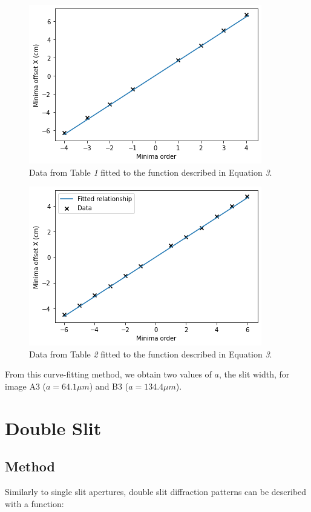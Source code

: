 \documentclass[a4paper]{article}
\begin{document}
\begin{figure}[h!]
\centerline{\includegraphics[scale=0.7]{L166plot.png}}
\caption{Data from Table \emph{1} fitted to the function described in Equation \emph{3}.}
\label{fig:l116plot}
\end{figure}
\newpage
\begin{figure}[h!]
\centerline{\includegraphics[scale=0.7]{L166bplot.png}}
\caption{Data from Table \emph{2} fitted to the function described in Equation \emph{3}.}
\label{fig:l116bplot}
\end{figure}

From this curve-fitting method, we obtain two values of $a$, the slit width, for image A3 ($a=64.1\mu m$) and B3 ($a=134.4\mu m$).

\section{Double Slit}
\subsection{Method}

Similarly to single slit apertures, double slit diffraction patterns can be described with a function:
\end{document}
